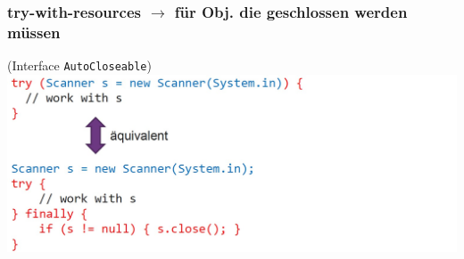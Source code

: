 {    \subsubsection{try-with-resources $\rightarrow$ für Obj. die geschlossen werden müssen}
        (Interface \verb|AutoCloseable|)\\
        \includegraphics[width=0.85\linewidth]{pictures/try-with-resources.jpg}
        \vspace{-0.2cm}
}